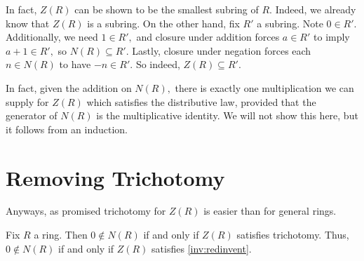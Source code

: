 \documentclass{article}
\begin{document}
\begin{remark}
	In fact, $Z(R)$ can be shown to be the smallest subring of $R.$ Indeed, we already know that $Z(R)$ is a subring. On the other hand, fix $R'$ a subring. Note $0\in R'.$ Additionally, we need $1\in R',$ and closure under addition forces $a\in R'$ to imply $a+1\in R',$ so $N(R)\subseteq R'.$ Lastly, closure under negation forces each $n\in N(R)$ to have $-n\in R'.$ So indeed, $Z(R)\subseteq R'.$
\end{remark}
In fact, given the addition on $N(R),$ there is exactly one multiplication we can supply for $Z(R)$ which satisfies the distributive law, provided that the generator of $N(R)$ is the multiplicative identity. We will not show this here, but it follows from an induction.

\section{Removing Trichotomy}
Anyways, as promised trichotomy for $Z(R)$ is easier than for general rings.
\begin{proposition} \label{prop:easyinv1}
	Fix $R$ a ring. Then $0\notin N(R)$ if and only if $Z(R)$ satisfies trichotomy. Thus, $0\notin N(R)$ if and only if $Z(R)$ satisfies \autoref{inv:redinvent}.
\end{proposition}
\end{document}
